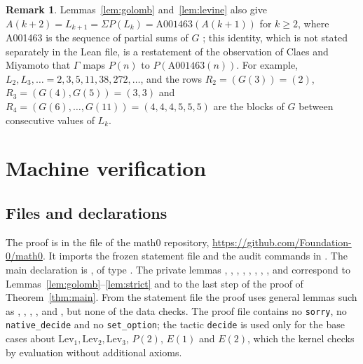 \documentclass[11pt]{amsart}
\theoremstyle{plain}
\theoremstyle{definition}
\newtheorem{remark}[theorem]{Remark}
\newcommand{\Lev}{\mathrm{Lev}}
\begin{document}
\begin{remark}
Lemmas~\ref{lem:golomb} and~\ref{lem:levine} also give $A(k+2)=L_{k+1}=\Sigma P(L_k)=\mathrm{A001463}(A(k+1))$ for $k\ge2$, where A001463 is the sequence of partial sums of $G$ \cite{A001463}; this identity, which is not stated separately in the Lean file, is a restatement of the observation of Claes and Miyamoto \cite[p.~3]{CM} that $\Gamma$ maps $P(n)$ to $P(\mathrm{A001463}(n))$. For example, $L_2,L_3,\dots=2,3,5,11,38,272,\dots$, and the rows $R_2=(G(3))=(2)$, $R_3=(G(4),G(5))=(3,3)$ and $R_4=(G(6),\dots,G(11))=(4,4,4,5,5,5)$ are the blocks of $G$ between consecutive values of $L_k$.
\end{remark}

\section{Machine verification}\label{sec:lean}

\subsection*{Files and declarations}
The proof is in the file  of the math0 repository, \url{https://github.com/Foundation-0/math0}. It imports the frozen statement file  and the audit commands in . The main declaration is , of type . The private lemmas , , , , , , , ,  and  correspond to Lemmas~\ref{lem:golomb}--\ref{lem:strict} and to the last step of the proof of Theorem~\ref{thm:main}. From the statement file the proof uses general lemmas such as , , , ,  and , but none of the data checks. The proof file contains no \texttt{sorry}, no \texttt{native\_decide} and no \texttt{set\_option}; the tactic \texttt{decide} is used only for the base cases about $\Lev_1,\Lev_2,\Lev_3$, $P(2)$, $E(1)$ and $E(2)$, which the kernel checks by evaluation without additional axioms.
\end{document}
